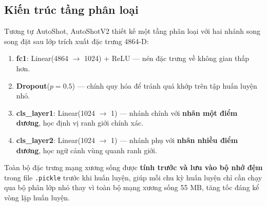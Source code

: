 \subsection{Kiến trúc tầng phân loại}
\label{subsec:v2_head}

Tương tự AutoShot, AutoShotV2 thiết kế một tầng phân loại với hai nhánh song song đặt sau lớp trích xuất đặc trưng 4864-D:
\begin{enumerate}
    \item \textbf{fc1}: Linear(4864 $\to$ 1024) + ReLU --- nén đặc trưng về không gian thấp hơn.
    \item \textbf{Dropout}($p = 0.5$) --- chính quy hóa để tránh quá khớp trên tập huấn luyện nhỏ.
    \item \textbf{cls\_layer1}: Linear(1024 $\to$ 1) --- nhánh chính với \textbf{nhãn một điểm dương}, học định vị ranh giới chính xác.
    \item \textbf{cls\_layer2}: Linear(1024 $\to$ 1) --- nhánh phụ với \textbf{nhãn nhiều điểm dương}, học ngữ cảnh vùng quanh ranh giới.
\end{enumerate}

Toàn bộ đặc trưng mạng xương sống được \textbf{tính trước và lưu vào bộ nhớ đệm} trong file \texttt{.pickle} trước khi huấn luyện, giúp mỗi chu kỳ huấn luyện chỉ cần chạy qua bộ phân lớp nhỏ thay vì toàn bộ mạng xương sống 55 MB, tăng tốc đáng kể vòng lặp huấn luyện.

